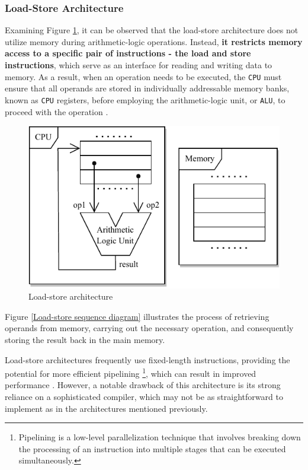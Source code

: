\documentclass[english, ing, kiv, he, iso690numb, pdf]{fasthesis}
\begin{document}
	\subsubsection{Load-Store Architecture} 
	
	Examining Figure \ref{Load-store architecture}, it can be observed that the load-store architecture does not utilize memory during arithmetic-logic operations. Instead, \textbf{it restricts memory access to a specific pair of instructions - the load and store instructions}, which serve as an interface for reading and writing data to memory. As a result, when an operation needs to be executed, the \texttt{CPU} must ensure that all operands are stored in individually addressable memory banks, known as \texttt{CPU} registers, before employing the arithmetic-logic unit, or \texttt{ALU}, to proceed with the operation \cite{computer-architecture-1}.
	
	\begin{figure}[ht]
		\centering
		\includegraphics[width=.58\textwidth]{img/diagrams/load_store_architecture.pdf}
		\caption{Load-store architecture}
		\label{Load-store architecture}
	\end{figure}
	
	Figure \ref{Load-store sequence diagram} illustrates the process of retrieving operands from memory, carrying out the necessary operation, and consequently storing the result back in the main memory.
	
	Load-store architectures frequently use fixed-length instructions, providing the potential for more efficient pipelining \footnote{Pipelining is a low-level parallelization technique that involves breaking down the processing of an instruction into multiple stages that can be executed simultaneously.}, which can result in improved \break performance \cite{arm-soc}. However, a notable drawback of this architecture is its strong reliance on a sophisticated compiler, which may not be as straightforward to implement as in the architectures mentioned previously.
	
\end{document}
